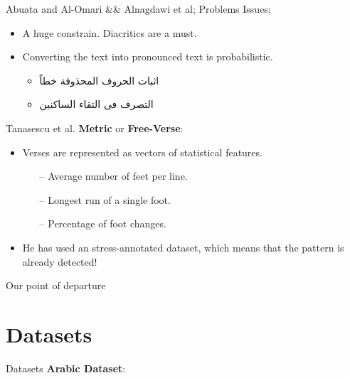 \documentclass[10pt]{beamer}
\begin{document}
\begin{frame}[fragile]{Abuata and Al-Omari \&\& Alnagdawi et al; Problems}
Issues;
    \begin{itemize}
       \item A huge constrain. \alert{Diacritics} are a must.
       \item Converting the text into pronounced text is \alert{probabilistic}.
            \begin{itemize}
                \item \textarabic{اثبات الحروف المحذوفة خطاً}
                \item \textarabic{التصرف فى التقاء الساكنين}
            \end{itemize}
    \end{itemize}
\end{frame}




\begin{frame}[fragile]{Tanasescu et al.}
\textbf{Metric} or \textbf{Free-Verse}: 
        \begin{itemize}
            \item Verses are represented as vectors of \alert{statistical features}.
            \begin{itemize}
                \item[--] Average number of feet per line.
                \item[--] Longest run of a single foot.
                \item[--] Percentage of foot changes.
            \end{itemize}
            \item He has used an stress-annotated dataset, which means that the pattern is already detected!
        \end{itemize}
\end{frame}

\begin{frame}[fragile]{Our point of departure}
\end{frame}

\section{Datasets}
\begin{frame}[fragile]{Datasets}
\textbf{Arabic Dataset}:
\begin{center}

\end{center}
\end{frame}
\end{document}
